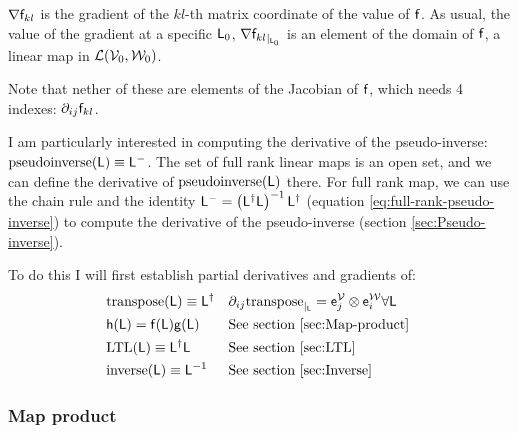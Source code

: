 ${\mathbf \nabla}{\mathsf{f}_{kl}}$ is the gradient of the $kl$-th matrix coordinate of the value of $\mathsf{f}$.
As usual, the value of the gradient at a specific $\mathsf{L}_0$,
${\mathbf \nabla}{\mathsf{f}_{kl}}_{\mid_{\mathsf{L}_0}}$ is an element of the domain of $\mathsf{f}$,
a linear map in $\mathcal{L}(\mathcal{V}_0,\mathcal{W}_0)$.

Note that nether of these are elements of the Jacobian of $\mathsf{f}$,
which needs 4 indexes: ${\partial}_{ij}{\mathsf{f}_{kl}}$.

I am particularly interested in computing the derivative of the
pseudo-inverse: $\mathrm{pseudoinverse}(\mathsf{L}) \equiv \mathsf{L}^{-}$.
The set of full rank linear maps is an open set,
and we can define the derivative of $\mathrm{pseudoinverse}(\mathsf{L})$ there.
For full rank map,
we can use the chain rule and the identity
$\mathsf{L}^{-} = \left( \mathsf{L}^{\dagger} \mathsf{L} \right)^{-1} \mathsf{L}^{\dagger}$
(equation \ref{eq:full-rank-pseudo-inverse})
to compute the derivative of the pseudo-inverse
(section \ref{sec:Pseudo-inverse}).

To do this I will first establish partial derivatives and gradients of:
\begin{align}
\label{eq:transpose-derivative}
&\mathrm{transpose}(\mathsf{L}) \equiv \mathsf{L}^{\dagger}
&&{\partial}_{ij}{\mathrm{transpose}}_{\mid_{\mathsf{L}}} =  \mathsf{e}_j^{\mathcal{V}} \otimes \mathsf{e}_i^{\mathcal{W}}
\forall \mathsf{L}
\\
&\mathsf{h}( \mathsf{L} ) = \mathsf{f} ( \mathsf{L} ) \mathsf{g} ( \mathsf{L} )
&&\text{See section \ref{sec:Map-product} }
\\
&\mathrm{LTL}(\mathsf{L}) \equiv \mathsf{L}^{\dagger} \mathsf{L}
&&\text{See section \ref{sec:LTL} }
\\
&\mathrm{inverse}(\mathsf{L}) \equiv \mathsf{L}^{-1}
&&\text{See section \ref{sec:Inverse} }
\end{align}


\subsubsection{Map product}
\label{sec:Map-product}

